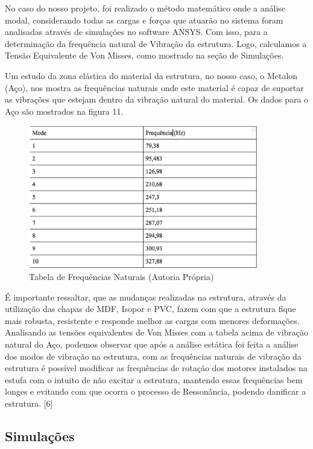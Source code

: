 No caso do nosso projeto, foi realizado o método matemático onde a análise modal, considerando todas as cargas e forças que atuarão no sistema foram analisadas através de simulações no software ANSYS. Com isso, para a determinação da frequência natural de Vibração da estrutura.  Logo, calculamos a Tensão Equivalente de Von Misses, como mostrado na seção de Simulações.

Um estudo da zona elástica do material da estrutura, no nosso caso, o Metalon (Aço), nos mostra as frequências naturais onde este material é capaz de suportar as vibrações que estejam dentro da vibração natural do material. Os dados para o Aço são mostrados na figura 11.

\begin{figure}[H]
 	\centering
 	\includegraphics[width=10cm]{figuras/tabela_frequencia.png}
 	\caption{Tabela de Frequências Naturais  (Autoria Própria)} 
 	\label{tabela_frequencia}
\end{figure}

É importante ressaltar, que as mudanças realizadas na estrutura, através da utilização das chapas de MDF, Isopor e PVC, fazem com que a estrutura fique mais robusta, resistente e responde melhor as cargas com menores deformações. Analisando as tensões equivalentes de Von Misses com a tabela acima de vibração natural do Aço, podemos observar que após a análise estática foi feita a análise dos modos de vibração na estrutura, com as frequências naturais de vibração da estrutura é possível modificar as frequências de rotação dos motores instalados na estufa com o intuito de não excitar a estrutura, mantendo essas frequências bem longes e evitando com que ocorra o processo de Ressonância, podendo danificar a estrutura. [6]

\subsection{Simulações}

